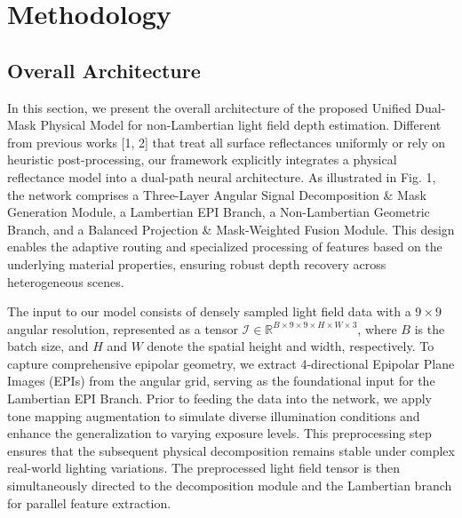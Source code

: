\section{Methodology}

\subsection{Overall Architecture}

In this section, we present the overall architecture of the proposed Unified Dual-Mask Physical Model for non-Lambertian light field depth estimation. Different from previous works [1, 2] that treat all surface reflectances uniformly or rely on heuristic post-processing, our framework explicitly integrates a physical reflectance model into a dual-path neural architecture. As illustrated in Fig. 1, the network comprises a Three-Layer Angular Signal Decomposition \& Mask Generation Module, a Lambertian EPI Branch, a Non-Lambertian Geometric Branch, and a Balanced Projection \& Mask-Weighted Fusion Module. This design enables the adaptive routing and specialized processing of features based on the underlying material properties, ensuring robust depth recovery across heterogeneous scenes.

The input to our model consists of densely sampled light field data with a $9 \times 9$ angular resolution, represented as a tensor $\mathcal{I} \in \mathbb{R}^{B \times 9 \times 9 \times H \times W \times 3}$, where $B$ is the batch size, and $H$ and $W$ denote the spatial height and width, respectively. To capture comprehensive epipolar geometry, we extract 4-directional Epipolar Plane Images (EPIs) from the angular grid, serving as the foundational input for the Lambertian EPI Branch. Prior to feeding the data into the network, we apply tone mapping augmentation to simulate diverse illumination conditions and enhance the generalization to varying exposure levels. This preprocessing step ensures that the subsequent physical decomposition remains stable under complex real-world lighting variations. The preprocessed light field tensor is then simultaneously directed to the decomposition module and the Lambertian branch for parallel feature extraction.

